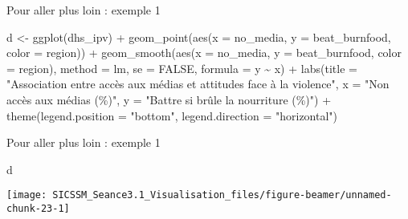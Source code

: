 \documentclass[
  ignorenonframetext,
]{beamer}
\newenvironment{Shaded}{\begin{snugshade}}{\end{snugshade}}
\newcommand{\AttributeTok}[1]{\textcolor[rgb]{0.77,0.63,0.00}{#1}}
\newcommand{\ConstantTok}[1]{\textcolor[rgb]{0.00,0.00,0.00}{#1}}
\newcommand{\FunctionTok}[1]{\textcolor[rgb]{0.00,0.00,0.00}{#1}}
\newcommand{\NormalTok}[1]{#1}
\newcommand{\OtherTok}[1]{\textcolor[rgb]{0.56,0.35,0.01}{#1}}
\newcommand{\SpecialCharTok}[1]{\textcolor[rgb]{0.00,0.00,0.00}{#1}}
\newcommand{\StringTok}[1]{\textcolor[rgb]{0.31,0.60,0.02}{#1}}
\begin{document}
\begin{frame}[fragile]{Pour aller plus loin : exemple 1}
\protect\hypertarget{pour-aller-plus-loin-exemple-1}{}
\begin{Shaded}
\begin{Highlighting}[]
\NormalTok{d }\OtherTok{\textless{}{-}} \FunctionTok{ggplot}\NormalTok{(dhs\_ipv) }\SpecialCharTok{+}
  \FunctionTok{geom\_point}\NormalTok{(}\FunctionTok{aes}\NormalTok{(}\AttributeTok{x =}\NormalTok{ no\_media, }\AttributeTok{y =}\NormalTok{ beat\_burnfood, }
                 \AttributeTok{color =}\NormalTok{ region)) }\SpecialCharTok{+}
  \FunctionTok{geom\_smooth}\NormalTok{(}\FunctionTok{aes}\NormalTok{(}\AttributeTok{x =}\NormalTok{ no\_media, }\AttributeTok{y =}\NormalTok{ beat\_burnfood, }
                  \AttributeTok{color =}\NormalTok{ region), }
              \AttributeTok{method =}\NormalTok{ lm, }\AttributeTok{se =} \ConstantTok{FALSE}\NormalTok{,  }\AttributeTok{formula =}\NormalTok{ y }\SpecialCharTok{\textasciitilde{}}\NormalTok{ x) }\SpecialCharTok{+} 
  \FunctionTok{labs}\NormalTok{(}\AttributeTok{title =} \StringTok{"Association entre accès aux médias et attitudes face à la violence"}\NormalTok{,}
       \AttributeTok{x =} \StringTok{"Non accès aux médias (\%)"}\NormalTok{,}
       \AttributeTok{y =} \StringTok{"Battre si brûle la nourriture (\%)"}\NormalTok{) }\SpecialCharTok{+}
  \FunctionTok{theme}\NormalTok{(}\AttributeTok{legend.position =} \StringTok{"bottom"}\NormalTok{, }\AttributeTok{legend.direction =} \StringTok{"horizontal"}\NormalTok{)}
\end{Highlighting}
\end{Shaded}
\end{frame}

\begin{frame}[fragile]{Pour aller plus loin : exemple 1}
\protect\hypertarget{pour-aller-plus-loin-exemple-1-1}{}
\begin{Shaded}
\begin{Highlighting}[]
\NormalTok{d}
\end{Highlighting}
\end{Shaded}

\begin{center}\texttt{[image: SICSSM\_Seance3.1\_Visualisation\_files/figure-beamer/unnamed-chunk-23-1]} \end{center}
\end{frame}
\end{document}
